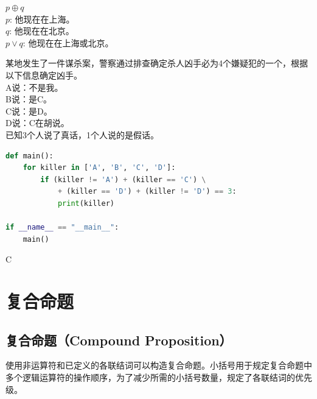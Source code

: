 \begin{tcolorbox}
	$ p \oplus q $\\
	$ p $: 他现在在上海。\\
	$ q $: 他现在在北京。\\
	$ p \vee q $: 他现在在上海或北京。
\end{tcolorbox}

\begin{tcolorbox}
	某地发生了一件谋杀案，警察通过排查确定杀人凶手必为4个嫌疑犯的一个，根据以下信息确定凶手。\\
	A说：不是我。\\
	B说：是C。\\
	C说：是D。\\
	D说：C在胡说。\\
	已知3个人说了真话，1个人说的是假话。
\end{tcolorbox}

\begin{lstlisting}[language=Python]
def main():
    for killer in ['A', 'B', 'C', 'D']:
        if (killer != 'A') + (killer == 'C') \
            + (killer == 'D') + (killer != 'D') == 3:
            print(killer)

if __name__ == "__main__":
    main()
\end{lstlisting}

\begin{tcolorbox}
	C
\end{tcolorbox}

\newpage

\section{复合命题}

\subsection{复合命题（Compound Proposition）}

使用非运算符和已定义的各联结词可以构造复合命题。小括号用于规定复合命题中多个逻辑运算符的操作顺序，为了减少所需的小括号数量，规定了各联结词的优先级。

\begin{table}[H]
	\centering
	\caption{运算符优先级}
\end{table}

